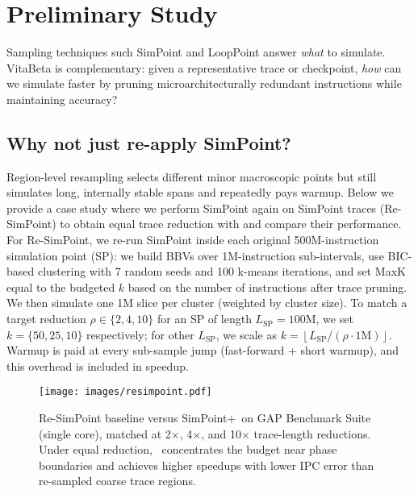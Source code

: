 \section{Preliminary Study}
Sampling techniques such SimPoint and LoopPoint answer \emph{what} to simulate. VitaBeta is complementary: given a representative trace or checkpoint, \emph{how} can we simulate faster by pruning microarchitecturally redundant instructions while maintaining accuracy?

\subsection*{Why not just re-apply SimPoint?}
Region-level resampling selects different minor macroscopic points but still simulates long, internally stable spans and repeatedly pays warmup. Below we provide a case study where we perform SimPoint again on SimPoint traces (Re-SimPoint) to obtain equal trace reduction with \name and compare their performance. For Re-SimPoint, we re-run SimPoint inside each original 500M-instruction simulation point (SP): we build BBVs over 1M-instruction sub-intervals, use BIC-based clustering with 7 random seeds and 100 k-means iterations, and set MaxK equal to the budgeted $k$ based on the number of instructions after trace pruning. We then simulate one 1M slice per cluster (weighted by cluster size). To match a target reduction $\rho\!\in\!\{2,4,10\}$ for an SP of length $L_{\text{SP}}{=}100$M, we set $k{=}\{50,25,10\}$ respectively; for other $L_{\text{SP}}$, we scale as $k=\left\lfloor L_{\text{SP}}/(\rho\cdot 1\text{M})\right\rfloor$. Warmup is paid at every sub-sample jump (fast-forward + short warmup), and this overhead is included in speedup.
 
\begin{figure}[!htbp]
    \centering
    \setlength{\belowcaptionskip}{-10pt}
    \captionsetup{skip=0pt}
    \captionsetup[subfigure]{font=footnotesize, skip=1pt}
    \texttt{[image: images/resimpoint.pdf]}
    \caption{Re-SimPoint baseline versus SimPoint+\name\ on GAP Benchmark Suite (single core), matched at 2$\times$, 4$\times$, and 10$\times$ trace-length reductions.  Under equal reduction, \name\ concentrates the budget near phase boundaries and achieves higher speedups with lower IPC error than re-sampled coarse trace regions.}
    \label{fig:re-simpoint}
\end{figure}

